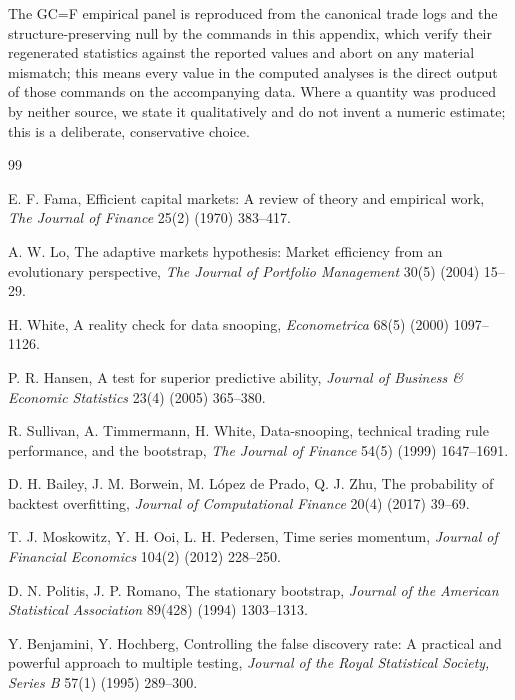\documentclass[preprint,12pt]{elsarticle}
\theoremstyle{definition}
\begin{document}
The GC=F empirical panel is reproduced from the canonical trade logs and the structure-preserving null by the commands in this appendix, which verify their regenerated statistics against the reported values and abort on any material mismatch; this means every value in the computed analyses is the direct output of those commands on the accompanying data. Where a quantity was produced by neither source, we state it qualitatively and do not invent a numeric estimate; this is a deliberate, conservative choice.



\begin{thebibliography}{99}

E. F. Fama, Efficient capital markets: A review of theory and empirical work,
\emph{The Journal of Finance} 25(2) (1970) 383--417.

A. W. Lo, The adaptive markets hypothesis: Market efficiency from an evolutionary perspective,
\emph{The Journal of Portfolio Management} 30(5) (2004) 15--29.

H. White, A reality check for data snooping,
\emph{Econometrica} 68(5) (2000) 1097--1126.

P. R. Hansen, A test for superior predictive ability,
\emph{Journal of Business \& Economic Statistics} 23(4) (2005) 365--380.

R. Sullivan, A. Timmermann, H. White, Data-snooping, technical trading rule performance, and the bootstrap,
\emph{The Journal of Finance} 54(5) (1999) 1647--1691.

D. H. Bailey, J. M. Borwein, M. L\'opez de Prado, Q. J. Zhu,
The probability of backtest overfitting,
\emph{Journal of Computational Finance} 20(4) (2017) 39--69.

T. J. Moskowitz, Y. H. Ooi, L. H. Pedersen, Time series momentum,
\emph{Journal of Financial Economics} 104(2) (2012) 228--250.

D. N. Politis, J. P. Romano, The stationary bootstrap,
\emph{Journal of the American Statistical Association} 89(428) (1994) 1303--1313.

Y. Benjamini, Y. Hochberg, Controlling the false discovery rate: A practical and powerful approach to multiple testing,
\emph{Journal of the Royal Statistical Society, Series B} 57(1) (1995) 289--300.


\end{thebibliography}
\end{document}
